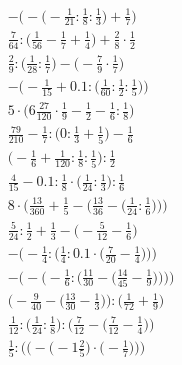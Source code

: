 \documentclass[8pt]{article}
\begin{document}
\begin{align}
-\Big(-\big(-\frac{1}{21} : \frac{1}{8} : \frac{1}{3}\big) + \frac{1}{7}\Big) \\
\frac{7}{64} : \big(\frac{1}{56} - \frac{1}{7} + \frac{1}{4}\big) + \frac{2}{8} \cdot \frac{1}{2} \\
\frac{2}{9} : \big(\frac{1}{28} : \frac{1}{7}\big) - \big(-\frac{7}{9} \cdot \frac{1}{7}\big) \\
-\Big(-\frac{1}{15} + 0.1 : \big(\frac{1}{60} : \frac{1}{2} : \frac{1}{5}\big)\Big) \\
5 \cdot \big(6\frac{27}{120} \cdot \frac{1}{9} - \frac{1}{2} - \frac{1}{6} : \frac{1}{8}\big) \\
\frac{79}{210} - \frac{1}{7} : \big(0 : \frac{1}{3} + \frac{1}{5}\big) - \frac{1}{6} \\
\big(-\frac{1}{6} + \frac{1}{120} : \frac{1}{8} : \frac{1}{5}\big) : \frac{1}{2} \\
\frac{4}{15} - 0.1 : \frac{1}{8} \cdot \big(\frac{1}{24} : \frac{1}{3}\big) : \frac{1}{6} \\
8 \cdot \bigg(\frac{13}{360} + \frac{1}{5} - \Big(\frac{13}{36} - \big(\frac{1}{24} : \frac{1}{6}\big)\Big)\bigg) \\
\frac{5}{24} : \frac{1}{2} + \frac{1}{3} - \big(-\frac{5}{12} - \frac{1}{6}\big) \\
-\bigg(-\frac{1}{4} : \Big(\frac{1}{4} : 0.1 \cdot \big(\frac{7}{20} - \frac{1}{4}\big)\Big)\bigg) \\
-\Bigg(-\bigg(-\frac{1}{6} : \Big(\frac{11}{30} - \big(\frac{14}{45} - \frac{1}{9}\big)\Big)\bigg)\Bigg) \\
\Big(-\frac{9}{40} - \big(\frac{13}{30} - \frac{1}{3}\big)\Big) : \Big(\frac{1}{72} + \frac{1}{9}\Big) \\
\frac{1}{12} : \Big(\frac{1}{24} : \frac{1}{8}\Big) : \Big(\frac{7}{12} - \big(\frac{7}{12} - \frac{1}{4}\big)\Big) \\
\frac{1}{5} : \bigg(\Big(-\big(-1\frac{2}{5}\big) \cdot \big(-\frac{1}{7}\big)\Big)\bigg)
\end{align}
\end{document}
